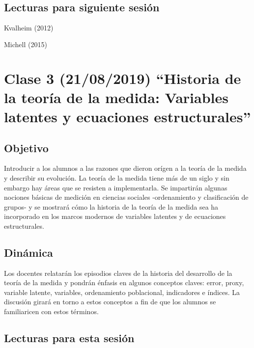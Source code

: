 \documentclass[11pt,]{article}
\begin{document}
\hypertarget{lecturas-para-siguiente-sesion}{%
\subsection{Lecturas para siguiente
sesión}\label{lecturas-para-siguiente-sesion}}

Kvalheim (2012)

Michell (2015)

\hypertarget{clase-3-21082019-historia-de-la-teoria-de-la-medida-variables-latentes-y-ecuaciones-estructurales}{%
\section{Clase 3 (21/08/2019) ``Historia de la teoría de la medida:
Variables latentes y ecuaciones
estructurales''}\label{clase-3-21082019-historia-de-la-teoria-de-la-medida-variables-latentes-y-ecuaciones-estructurales}}

\hypertarget{objetivo-2}{%
\subsection{Objetivo}\label{objetivo-2}}

Introducir a los alumnos a las razones que dieron orígen a la teoría de
la medida y describir su evolución. La teoría de la medida tiene más de
un siglo y sin embargo hay áreas que se resisten a implementarla. Se
impartirán algunas nociones básicas de medición en ciencias sociales
-ordenamiento y clasificación de grupos- y se mostrará cómo la historia
de la teoría de la medida sea ha incorporado en los marcos modernos de
variables latentes y de ecuaciones estructurales.

\hypertarget{dinamica-2}{%
\subsection{Dinámica}\label{dinamica-2}}

Los docentes relatarán los episodios claves de la historia del
desarrollo de la teoría de la medida y pondrán énfasis en algunos
conceptos claves: error, proxy, variable latente, variables,
ordenamiento poblacional, indicadores e índices. La discusión girará en
torno a estos conceptos a fin de que los alumnos se familiaricen con
estos términos.

\hypertarget{lecturas-para-esta-sesion-1}{%
\subsection{Lecturas para esta
sesión}\label{lecturas-para-esta-sesion-1}}
\end{document}

